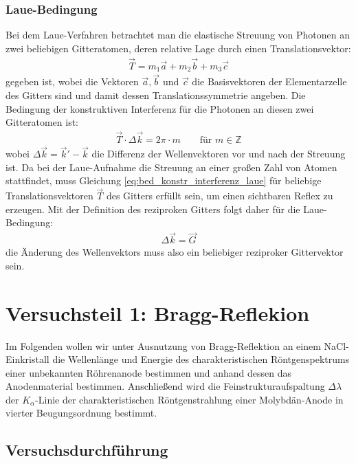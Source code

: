 \documentclass[11pt, a4paper]{article}
\begin{document}
\subsubsection{Laue-Bedingung}
Bei dem Laue-Verfahren betrachtet man die elastische Streuung von Photonen an zwei beliebigen Gitteratomen, deren relative Lage durch einen Translationsvektor:
\begin{align}
  \vec{T} = m_1 \vec{a} + m_2 \vec{b} + m_3 \vec{c}
\end{align}
gegeben ist, wobei die Vektoren $\vec{a}, \vec{b}$ und $\vec{c}$ die Basisvektoren der Elementarzelle des Gitters sind und damit dessen Translationssymmetrie angeben.
Die Bedingung der konstruktiven Interferenz für die Photonen an diesen zwei Gitteratomen ist:
\begin{align}
  \vec{T} \cdot \Delta \vec{k} = 2\pi \cdot m \qquad \text{für } m \in \mathbb{Z}
  \label{eq:bed_konstr_interferenz_laue}
\end{align}
wobei $\Delta \vec{k} = \vec{k}' - \vec{k}$ die Differenz der Wellenvektoren vor und nach der Streuung ist.
Da bei der Laue-Aufnahme die Streuung an einer großen Zahl von Atomen stattfindet, muss Gleichung \ref{eq:bed_konstr_interferenz_laue} für beliebige Translationsvektoren $\vec{T}$ des Gitters erfüllt sein, um einen sichtbaren Reflex zu erzeugen.
Mit der Definition des reziproken Gitters folgt daher für die Laue-Bedingung:
\begin{align}
  \Delta \vec{k} = \vec{G}
\end{align}
die Änderung des Wellenvektors muss also ein beliebiger reziproker Gittervektor sein.

\section{Versuchsteil 1: Bragg-Reflekion}
Im Folgenden wollen wir unter Ausnutzung von Bragg-Reflektion an einem NaCl-Einkristall die Wellenlänge und Energie des charakteristischen Röntgenspektrums einer unbekannten Röhrenanode bestimmen und anhand dessen das Anodenmaterial bestimmen.
Anschließend wird die Feinstrukturaufspaltung $\Delta \lambda$ der $K_\alpha$-Linie der charakteristischen Röntgenstrahlung einer Molybdän-Anode in vierter Beugungsordnung bestimmt.

\subsection{Versuchsdurchführung}
\end{document}

